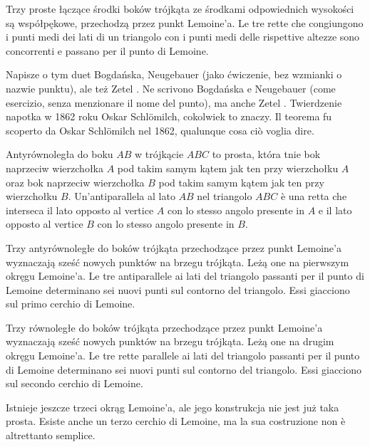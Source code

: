 \begin{proposition}
[twierdzenie Schlömilcha] %
[teorema di Schlömilch] %
    Trzy proste łączące środki boków trójkąta ze środkami odpowiednich wysokości są współpękowe, przechodzą przez punkt Lemoine'a. %
    Le tre rette che congiungono i punti medi dei lati di un triangolo con i punti medi delle rispettive altezze sono concorrenti e passano per il punto di Lemoine. %
\end{proposition}


Napisze o tym duet Bogdańska, Neugebauer \cite[s. 195]{neugebauer_2018} (jako ćwiczenie, bez wzmianki o nazwie punktu), ale też Zetel \cite[s. 34]{zetel_2020}. %
Ne scrivono Bogdańska e Neugebauer \cite[p. 195]{neugebauer_2018} (come esercizio, senza menzionare il nome del punto), ma anche Zetel \cite[p. 34]{zetel_2020}. %
Twierdzenie napotka w 1862 roku Oskar Schlömilch, cokolwiek to znaczy. %
Il teorema fu scoperto da Oskar Schlömilch nel 1862, qualunque cosa ciò voglia dire. %

\begin{definition}
[antyrównoległa] %
[antiparallela] %
    Antyrównoległa do boku $AB$ w trójkącie $ABC$ to prosta, która tnie bok naprzeciw wierzchołka $A$ pod takim samym kątem jak ten przy wierzchołku $A$ oraz bok naprzeciw wierzchołka $B$ pod takim samym kątem jak ten przy wierzchołku $B$. %
    Un'antiparallela al lato $AB$ nel triangolo $ABC$ è una retta che interseca il lato opposto al vertice $A$ con lo stesso angolo presente in $A$ e il lato opposto al vertice $B$ con lo stesso angolo presente in $B$. %
\end{definition}

\begin{proposition}
    Trzy antyrównoległe do boków trójkąta przechodzące przez punkt Lemoine'a wyznaczają sześć nowych punktów na brzegu trójkąta. Leżą one na pierwszym okręgu Lemoine'a. %
    Le tre antiparallele ai lati del triangolo passanti per il punto di Lemoine determinano sei nuovi punti sul contorno del triangolo. Essi giacciono sul primo cerchio di Lemoine. %
\end{proposition}

\begin{proposition}
    Trzy równoległe do boków trójkąta przechodzące przez punkt Lemoine'a wyznaczają sześć nowych punktów na brzegu trójkąta. Leżą one na drugim okręgu Lemoine'a. %
    Le tre rette parallele ai lati del triangolo passanti per il punto di Lemoine determinano sei nuovi punti sul contorno del triangolo. Essi giacciono sul secondo cerchio di Lemoine. %
\end{proposition}

Istnieje jeszcze trzeci okrąg Lemoine'a, ale jego konstrukcja nie jest już taka prosta. %
Esiste anche un terzo cerchio di Lemoine, ma la sua costruzione non è altrettanto semplice. %

%